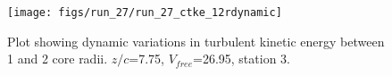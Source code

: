 \begin{figure}[H]
\centering
\texttt{[image: figs/run\_27/run\_27\_ctke\_12rdynamic]}
\caption{Plot showing dynamic variations in turbulent kinetic energy between 1 and 2 core radii. $z/c$=7.75, $V_{free}$=26.95, station 3.}
\label{fig:run_27_ctke_12rdynamic}
\end{figure}


